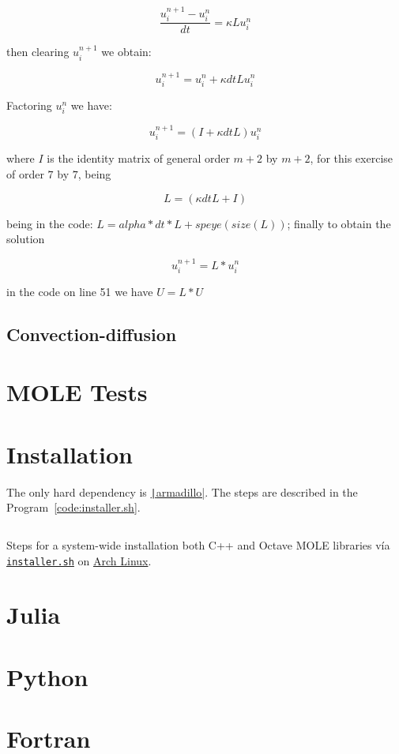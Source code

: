 \documentclass[a4paper,abstract=true]{scrreprt}
\begin{document}
\begin{equation}
	\frac{u^{n+1}_{i} - u^{n}_{i} }{dt} = \kappa L 	u^{n}_{i}
\end{equation}

then clearing $u^{n+1}_{i}$ we obtain:


\begin{equation}
	u^{n+1}_{i} = u^{n}_{i}  +  \kappa dt L u^{n}_{i}
\end{equation}

Factoring $u^{n}_{i}$ we have:

\begin{equation}
	u^{n+1}_{i} = (I  +  \kappa dt L )u^{n}_{i}
\end{equation}

where $I$ is the identity matrix of general order $m+2$ by $m+2$, for this exercise of order $7$ by $7$, being

$$  L = (\kappa dt L +I )$$

being in the code: $ L = alpha*dt*L + speye(size(L))$; finally to obtain the solution

\begin{equation}
	u^{n+1}_{i} = L *u^{n}_{i}
\end{equation}

in the code on line 51 we have $ U = L*U$






\section{Convection-diffusion}

\chapter{MOLE Tests}

\appendix

\chapter{Installation}

The only hard dependency is
\href{https://arma.sourceforge.net/docs.html}{\texttt|armadillo|}.
The steps are described in the Program~\ref{code:installer.sh}.

\begin{listing}[ht!]
	\tiny
	\centering
	\inputminted[frame=single,framesep=10pt,linenos,firstline=1,lastline=18,highlightlines={9,15}]{bash}{installer.sh}
	\caption{Steps for a system-wide installation both C++ and Octave
		MOLE libraries vía \href{https://raw.githubusercontent.com/carlosal1015/mole_examples/main/homework/installer.sh}{\texttt{installer.sh}} on
		\href{https://archlinux.org}{Arch Linux}.}
	\label{code:installer.sh}
\end{listing}

\chapter{Julia}

\chapter{Python}

\chapter{Fortran}

\nocite{*}
\printbibliography[title={References}]
\end{document}
